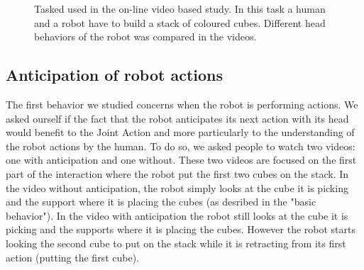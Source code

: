 \documentclass[english,a4paper,11pt,twoside]{StyleThese}
\begin{document}
\begin{figure}[!h]
\centering
    \caption{Tasked used in the on-line video based study. In this task a human and a robot have to build a stack of coloured cubes. Different head behaviors of the robot was compared in the videos.}
    \label{fig:videoTask}
\end{figure}

\subsection{Anticipation of robot actions}

The first behavior we studied concerns when the robot is performing actions. We asked ourself if the fact that the robot anticipates its next action with its head would benefit to the Joint Action and more particularly to the understanding of the robot actions by the human. To do so, we asked people to watch two videos: one with anticipation and one without. These two videos are focused on the first part of the interaction where the robot put the first two cubes on the stack. In the video without anticipation, the robot simply looks at the cube it is picking and the support where it is placing the cubes (as desribed in the "basic behavior"). In the video with anticipation the robot still looks at the cube it is picking and the supports where it is placing the cubes. However the robot starts looking the second cube to put on the stack while it is retracting from its first action (putting the first cube).
\end{document}
